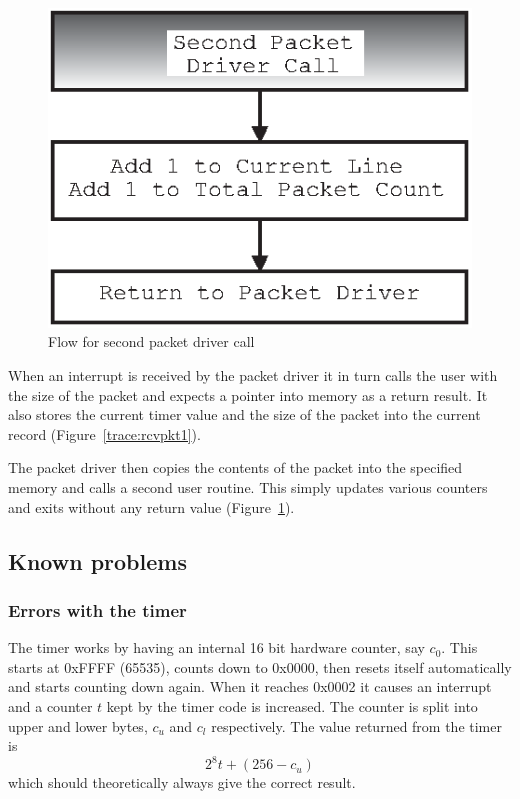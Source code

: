 \begin{figure}
\begin{center}
\leavevmode
\includegraphics{pics/rcvPkt2-flow.eps}
\end{center}
\caption{Flow for second packet driver call}
\label{trace:rcvpkt2}
\end{figure}

When an interrupt is received by the packet driver it in turn calls
the user with the size of the packet and expects a pointer into memory
as a return result.  It also stores the current timer value and the
size of the packet into the current record
(Figure~\ref{trace:rcvpkt1}).

The packet driver then copies the contents of the packet into the
specified memory and calls a second user routine.  This simply updates
various counters and exits without any return value
(Figure~\ref{trace:rcvpkt2}).

\subsection{Known problems}

\subsubsection{Errors with the timer}
\label{trace:timerprob}

The timer works by having an internal 16 bit hardware counter, say
$c_0$. This starts at 0xFFFF (65535), counts down to 0x0000, then
resets itself automatically and starts counting down again.  When it
reaches 0x0002 it causes an interrupt and a counter $t$ kept by the
timer code is increased.  The counter is split into upper and lower
bytes, $c_u$ and $c_l$ respectively.  The value returned from the
timer is
\[
2^{8}t + (256 - c_u)
\]
which should theoretically always give the correct result.

